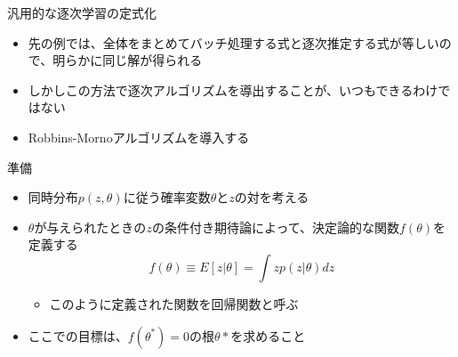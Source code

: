 \begin{frame}{汎用的な逐次学習の定式化}
 \begin{itemize}
  \item 先の例では、全体をまとめてバッチ処理する式と逐次推定する式が等しいので、明らかに同じ解が得られる
  \item しかしこの方法で逐次アルゴリズムを導出することが、いつもできるわけではない
  \item \alert{Robbins-Mornoアルゴリズム}を導入する
 \end{itemize}
\end{frame}


\begin{frame}{準備}
 \begin{itemize}
  \item 同時分布$p(z,\theta)$に従う確率変数$\theta$と$z$の対を考える
  \item $\theta$が与えられたときの$z$の条件付き期待論によって、決定論的な関数$f(\theta)$を定義する
        \begin{equation}
         f(\theta) \equiv E[z|\theta] = \int zp(z|\theta)dz
        \end{equation}
        \begin{itemize}
         \item このように定義された関数を回帰関数と呼ぶ
        \end{itemize}
  \item ここでの目標は、$f(\theta^\ast)=0$の根$\theta\ast$を求めること
 \end{itemize}
\end{frame}

